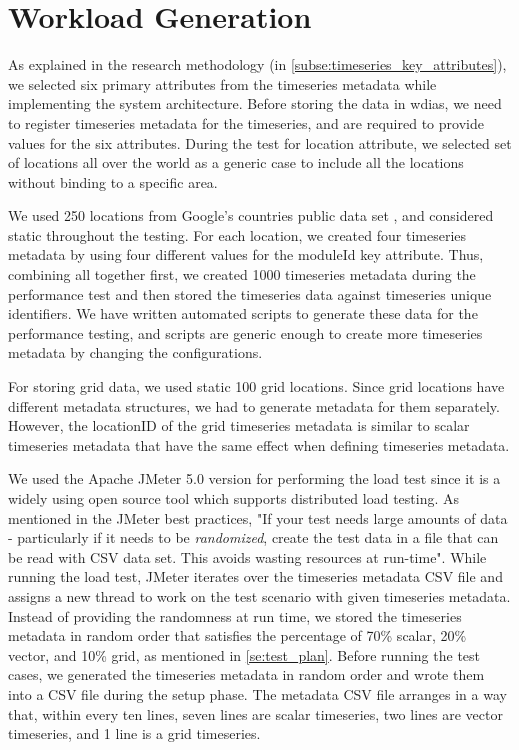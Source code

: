 \section{Workload Generation}
\label{se:workload}

As explained in the research methodology (in \cref{subse:timeseries_key_attributes}), we selected six primary attributes from the timeseries metadata while implementing the system architecture. Before storing the data in \acrshort{wdias}, we need to register timeseries metadata for the timeseries, and are required to provide values for the six attributes. During the test for location attribute, we selected set of locations all over the world as a generic case to include all the locations without binding to a specific area.

We used 250 locations from Google’s countries public data set \cite{GoogleGoogleCountries}, and considered static throughout the testing. For each location, we created four timeseries metadata by using four different values for the moduleId key attribute. Thus, combining all together first, we created 1000 timeseries metadata during the performance test and then stored the timeseries data against timeseries unique identifiers. We have written automated scripts to generate these data for the performance testing, and scripts are generic enough to create more timeseries metadata by changing the configurations.

For storing grid data, we used static 100 grid locations. Since grid locations have different metadata structures, we had to generate metadata for them separately. However, the locationID of the grid timeseries metadata is similar to scalar timeseries metadata that have the same effect when defining timeseries metadata.

We used the Apache JMeter 5.0 version \cite{ApacheSoftwareFoundationApacheJMeter} for performing the load test since it is a widely using open source tool which supports distributed load testing. As mentioned in the JMeter best practices, "If your test needs large amounts of data - particularly if it needs to be \emph{randomized}, create the test data in a file that can be read with CSV data set. This avoids wasting resources at run-time". While running the load test, JMeter iterates over the timeseries metadata CSV file and assigns a new thread to work on the test scenario with given timeseries metadata. Instead of providing the randomness at run time, we stored the timeseries metadata in random order that satisfies the percentage of 70\% scalar, 20\% vector, and 10\% grid, as mentioned in \cref{se:test_plan}.
Before running the test cases, we generated the timeseries metadata in random order and wrote them into a CSV file during the setup phase. The metadata CSV file arranges in a way that, within every ten lines, seven lines are scalar timeseries, two lines are vector timeseries, and 1 line is a grid timeseries.

